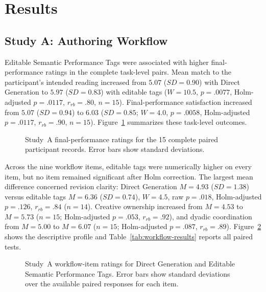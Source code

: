 \section{Results}

\subsection{Study A: Authoring Workflow}

Editable Semantic Performance Tags were associated with higher final-performance ratings in the complete task-level pairs. Mean match to the participant's intended reading increased from $5.07$ ($SD=0.90$) with Direct Generation to $5.97$ ($SD=0.83$) with editable tags ($W=10.5$, $p=.0077$, Holm-adjusted $p=.0117$, $r_{rb}=.80$, $n=15$). Final-performance satisfaction increased from $5.07$ ($SD=0.94$) to $6.03$ ($SD=0.85$; $W=4.0$, $p=.0058$, Holm-adjusted $p=.0117$, $r_{rb}=.90$, $n=15$). Figure~\ref{fig:study-a-task} summarizes these task-level outcomes.

\begin{figure}[t]
    \centering
    
    \caption{Study~A final-performance ratings for the 15 complete paired participant records. Error bars show standard deviations.}
    \label{fig:study-a-task}
\end{figure}

Across the nine workflow items, editable tags were numerically higher on every item, but no item remained significant after Holm correction. The largest mean difference concerned revision clarity: Direct Generation $M=4.93$ ($SD=1.38$) versus editable tags $M=6.36$ ($SD=0.74$), $W=4.5$, raw $p=.018$, Holm-adjusted $p=.126$, $r_{rb}=.84$ ($n=14$). Creative ownership increased from $M=4.53$ to $M=5.73$ ($n=15$; Holm-adjusted $p=.053$, $r_{rb}=.92$), and dyadic coordination from $M=5.00$ to $M=6.07$ ($n=15$; Holm-adjusted $p=.087$, $r_{rb}=.89$). Figure~\ref{fig:study-a-workflow} shows the descriptive profile and Table~\ref{tab:workflow-results} reports all paired tests.

\begin{figure}[t]
    \centering
    
    \caption{Study~A workflow-item ratings for Direct Generation and Editable Semantic Performance Tags. Error bars show standard deviations over the available paired responses for each item.}
    \label{fig:study-a-workflow}
\end{figure}

